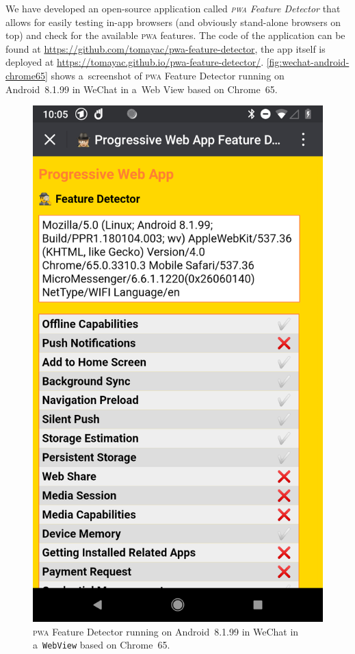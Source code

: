 \documentclass[sigconf]{acmart}
\begin{document}
We have developed an open-source application called \emph{\textsc{pwa} Feature Detector}
that allows for easily testing in-app browsers (and obviously stand-alone browsers on top)
and check for the available \textsc{pwa} features.
The code of the application can be found at
\url{https://github.com/tomayac/pwa-feature-detector},
the app itself is deployed at \url{https://tomayac.github.io/pwa-feature-detector/}.
\autoref{fig:wechat-android-chrome65} shows a~screenshot of \textsc{pwa} Feature Detector
running on Android~8.1.99 in WeChat in a~Web View based on Chrome~65.

\begin{figure}[hbt]
  \centering
  \includegraphics[width=\columnwidth,frame]{pwa-feature-detector-wechat-android-chrome65}
  \caption[\textsc{pwa} Feature Detector running in WeChat.]{
    \textsc{pwa} Feature Detector running on Android~8.1.99 in WeChat
    in a~\texttt{WebView} based on Chrome~65.}
  \label{fig:wechat-android-chrome65}
\end{figure}
\end{document}

